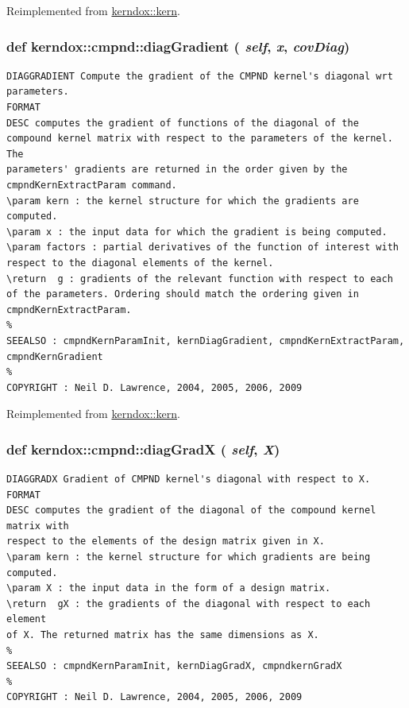 Reimplemented from \hyperlink{classkerndox_1_1kern}{kerndox::kern}.\hypertarget{classkerndox_1_1cmpnd_0e17dcc7e3bde7bec100461fcc4a6bb4}{
\subsubsection[{diagGradient}]{\setlength{\rightskip}{0pt plus 5cm}def kerndox::cmpnd::diagGradient ( {\em self}, \/   {\em x}, \/   {\em covDiag})}}
\label{classkerndox_1_1cmpnd_0e17dcc7e3bde7bec100461fcc4a6bb4}




\footnotesize\begin{verbatim}DIAGGRADIENT Compute the gradient of the CMPND kernel's diagonal wrt parameters.
FORMAT
DESC computes the gradient of functions of the diagonal of the
compound kernel matrix with respect to the parameters of the kernel. The
parameters' gradients are returned in the order given by the
cmpndKernExtractParam command.
\param kern : the kernel structure for which the gradients are
computed.
\param x : the input data for which the gradient is being computed.
\param factors : partial derivatives of the function of interest with
respect to the diagonal elements of the kernel.
\return  g : gradients of the relevant function with respect to each
of the parameters. Ordering should match the ordering given in
cmpndKernExtractParam.
%
SEEALSO : cmpndKernParamInit, kernDiagGradient, cmpndKernExtractParam, cmpndKernGradient
%
COPYRIGHT : Neil D. Lawrence, 2004, 2005, 2006, 2009

\end{verbatim}
\normalsize
 

Reimplemented from \hyperlink{classkerndox_1_1kern}{kerndox::kern}.\hypertarget{classkerndox_1_1cmpnd_7d38f78fb440a79986244a97af3ecdef}{
\subsubsection[{diagGradX}]{\setlength{\rightskip}{0pt plus 5cm}def kerndox::cmpnd::diagGradX ( {\em self}, \/   {\em X})}}
\label{classkerndox_1_1cmpnd_7d38f78fb440a79986244a97af3ecdef}




\footnotesize\begin{verbatim}DIAGGRADX Gradient of CMPND kernel's diagonal with respect to X.
FORMAT
DESC computes the gradient of the diagonal of the compound kernel matrix with
respect to the elements of the design matrix given in X.
\param kern : the kernel structure for which gradients are being computed.
\param X : the input data in the form of a design matrix.
\return  gX : the gradients of the diagonal with respect to each element
of X. The returned matrix has the same dimensions as X.
%
SEEALSO : cmpndKernParamInit, kernDiagGradX, cmpndkernGradX
%
COPYRIGHT : Neil D. Lawrence, 2004, 2005, 2006, 2009

\end{verbatim}
\normalsize
 

